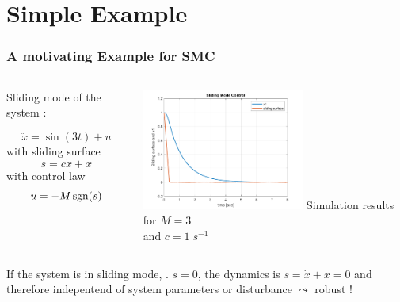\section{Simple Example}
\begin{frame}
  \frametitle{A motivating Example for SMC}

  
 \begin{columns}

   \begin{example}
     Sliding mode of the system \cite{utkin2020}:

      \begin{equation}
         \ddot x = \sin(3 t) + u 
       \end{equation}
       with sliding surface
       \begin{equation}
        s = c \dot x + x
       \end{equation}
       with control law
       \begin{equation}
         u = -M \sgn(s)
       \end{equation}
    \end{example}   
   \centering
   \includegraphics[height=4cm]{./pictures/SMCutkinRoadmap.pdf}
   Simulation results for $M = 3$ \\ and $c = 1\; \unit{s}^{-1}$
\end{columns}

\vspace*{2mm}

  If the system is in sliding mode, \ie. $s=0$, the dynamics is
  $s = \dot x + x =0$ and therefore indepentend of system
  parameters or disturbance $\leadsto$ robust !

\end{frame}


